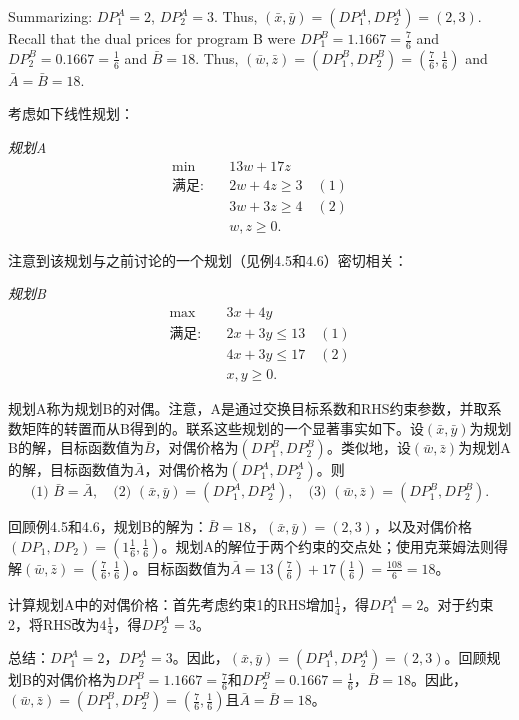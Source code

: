 \begin{original}
Summarizing: $DP_1^A = 2$, $DP_2^A = 3$. Thus, $(\bar{x}, \bar{y}) = (DP_1^A, DP_2^A) = (2, 3)$. Recall that the dual prices for program B were $DP_1^B = 1.1667 = \frac{7}{6}$ and $DP_2^B = 0.1667 = \frac{1}{6}$ and $\bar{B} = 18$. Thus, $(\bar{w}, \bar{z}) = (DP_1^B, DP_2^B) = \left(\frac{7}{6}, \frac{1}{6}\right)$ and $\bar{A} = \bar{B} = 18$.
\end{original}
\begin{translation}
考虑如下线性规划：

\noindent\textit{规划A}
\[
\begin{aligned}
\min \quad & 13w + 17z \\
\text{满足:} \quad & 2w + 4z \ge 3 \quad (1) \\
& 3w + 3z \ge 4 \quad (2) \\
& w, z \ge 0.
\end{aligned}
\]

注意到该规划与之前讨论的一个规划（见例4.5和4.6）密切相关：

\noindent\textit{规划B}
\[
\begin{aligned}
\max \quad & 3x + 4y \\
\text{满足:} \quad & 2x + 3y \le 13 \quad (1) \\
& 4x + 3y \le 17 \quad (2) \\
& x, y \ge 0.
\end{aligned}
\]

规划A称为规划B的对偶。注意，A是通过交换目标系数和RHS约束参数，并取系数矩阵的转置而从B得到的。联系这些规划的一个显著事实如下。设$(\bar{x}, \bar{y})$为规划B的解，目标函数值为$\bar{B}$，对偶价格为$(DP_1^B, DP_2^B)$。类似地，设$(\bar{w}, \bar{z})$为规划A的解，目标函数值为$\bar{A}$，对偶价格为$(DP_1^A, DP_2^A)$。则
\[
\text{(1) } \bar{B} = \bar{A},\quad \text{(2) } (\bar{x}, \bar{y}) = (DP_1^A, DP_2^A),\quad \text{(3) } (\bar{w}, \bar{z}) = (DP_1^B, DP_2^B).
\]

回顾例4.5和4.6，规划B的解为：$\bar{B} = 18$，$(\bar{x}, \bar{y}) = (2, 3)$，以及对偶价格$(DP_1, DP_2) = \left(1\frac{1}{6}, \frac{1}{6}\right)$。规划A的解位于两个约束的交点处；使用克莱姆法则得解$(\bar{w}, \bar{z}) = \left(\frac{7}{6}, \frac{1}{6}\right)$。目标函数值为$\bar{A} = 13\left(\frac{7}{6}\right) + 17\left(\frac{1}{6}\right) = \frac{108}{6} = 18$。

计算规划A中的对偶价格：首先考虑约束1的RHS增加$\frac{1}{4}$，得$DP_1^A = 2$。对于约束2，将RHS改为$4\frac{1}{4}$，得$DP_2^A = 3$。

总结：$DP_1^A = 2$，$DP_2^A = 3$。因此，$(\bar{x}, \bar{y}) = (DP_1^A, DP_2^A) = (2, 3)$。回顾规划B的对偶价格为$DP_1^B = 1.1667 = \frac{7}{6}$和$DP_2^B = 0.1667 = \frac{1}{6}$，$\bar{B} = 18$。因此，$(\bar{w}, \bar{z}) = (DP_1^B, DP_2^B) = \left(\frac{7}{6}, \frac{1}{6}\right)$且$\bar{A} = \bar{B} = 18$。
\end{translation}


